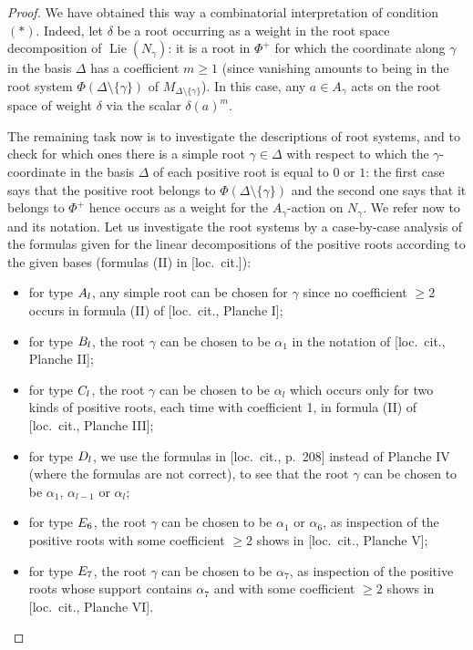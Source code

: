 \documentclass[11pt]{article}
\theoremstyle{definition}
\numberwithin{equation}{section}
\numberwithin{figure}{section}
\numberwithin{table}{section}
\DeclareMathOperator{\Lie}{Lie}
\begin{document}
\begin{proof}
We have obtained this way a combinatorial interpretation of condition $(*)$. Indeed, let $\delta$ be a root occurring as a weight in the root space decomposition of $\Lie(N_\gamma)$: it is a root in $\Phi^+$ for which the coordinate along $\gamma$ in the basis $\Delta$ has a coefficient $m
\geqslant 1$ (since vanishing amounts to being in the root system $\Phi(\Delta \setminus \{ \gamma \})$ of $M_{\Delta \setminus \{\gamma \}}$). In this case, any $a \in A_\gamma$ acts on the root space of weight $\delta$ via the scalar $\delta(a)^m$.

The remaining task now is to investigate the descriptions of root systems, and to check for which ones there is a simple root $\gamma \in \Delta$ with respect to which the $\gamma$-coordinate in the basis $\Delta$ of each positive root is equal to $0$ or $1$: the first case says that the positive root belongs to $\Phi(\Delta \setminus \{ \gamma \})$ and the second one says that it belongs to $\Phi^+$ hence occurs as a weight for the $A_\gamma$-action on $N_\gamma$. We refer now to~\cite[Planches]{BBK-Lie-4to6} and its notation. Let us investigate the root systems by a case-by-case analysis of the formulas given for the linear decompositions of the positive roots according to the given bases (formulas (II) in [loc.~cit.]):
\begin{itemize}
\item for type ${\rm A}_l$, any simple root can be chosen for $\gamma$ since no coefficient $\geqslant 2$ occurs in formula (II) of [loc.~cit., Planche I];
\item for type ${\rm B}_l$, the root $\gamma$ can be chosen to be $\alpha_1$ in the notation of [loc.~cit., Planche II];
\item for type ${\rm C}_l$, the root $\gamma$ can be chosen to be $\alpha_l$ which occurs only for two kinds of positive roots, each time with coefficient 1, in formula (II) of [loc.~cit., Planche III];
\item for type ${\rm D}_l$, we use the formulas in [loc.~cit., p.~208] instead of Planche IV (where the formulas are not correct), to see that the root $\gamma$ can be chosen to be $\alpha_1$, $\alpha_{l-1}$ or $\alpha_l$;
\item for type ${\rm E}_6$, the root $\gamma$ can be chosen to be $\alpha_1$ or $\alpha_6$, as inspection of the positive roots with some coefficient $\geqslant 2$ shows in [loc.~cit., Planche V];
\item for type ${\rm E}_7$, the root $\gamma$ can be chosen to be $\alpha_7$, as inspection of the positive roots whose support contains $\alpha_7$ and with some coefficient $\geqslant 2$ shows in [loc.~cit., Planche VI].
\end{itemize}


\end{proof}
\end{document}
